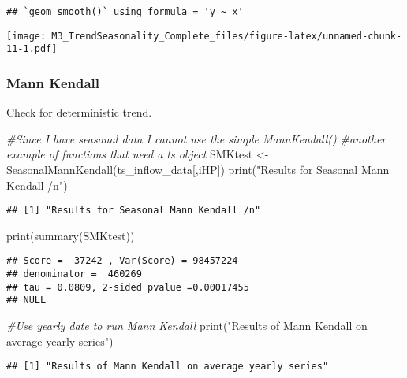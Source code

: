 \documentclass[
]{article}
\newenvironment{Shaded}{\begin{snugshade}}{\end{snugshade}}
\newcommand{\CommentTok}[1]{\textcolor[rgb]{0.56,0.35,0.01}{\textit{#1}}}
\newcommand{\FunctionTok}[1]{\textcolor[rgb]{0.00,0.00,0.00}{#1}}
\newcommand{\NormalTok}[1]{#1}
\newcommand{\OtherTok}[1]{\textcolor[rgb]{0.56,0.35,0.01}{#1}}
\newcommand{\StringTok}[1]{\textcolor[rgb]{0.31,0.60,0.02}{#1}}
\begin{document}
\begin{verbatim}
## `geom_smooth()` using formula = 'y ~ x'
\end{verbatim}

\texttt{[image: M3\_TrendSeasonality\_Complete\_files/figure-latex/unnamed-chunk-11-1.pdf]}

\hypertarget{mann-kendall}{%
\subsubsection{Mann Kendall}\label{mann-kendall}}

Check for deterministic trend.

\begin{Shaded}
\begin{Highlighting}[]
\CommentTok{\#Since I have seasonal data I cannot use the simple MannKendall()}
\CommentTok{\#another example of functions that need a ts object}
\NormalTok{SMKtest }\OtherTok{\textless{}{-}} \FunctionTok{SeasonalMannKendall}\NormalTok{(ts\_inflow\_data[,iHP])}
\FunctionTok{print}\NormalTok{(}\StringTok{"Results for Seasonal Mann Kendall /n"}\NormalTok{)}
\end{Highlighting}
\end{Shaded}

\begin{verbatim}
## [1] "Results for Seasonal Mann Kendall /n"
\end{verbatim}

\begin{Shaded}
\begin{Highlighting}[]
\FunctionTok{print}\NormalTok{(}\FunctionTok{summary}\NormalTok{(SMKtest))}
\end{Highlighting}
\end{Shaded}

\begin{verbatim}
## Score =  37242 , Var(Score) = 98457224
## denominator =  460269
## tau = 0.0809, 2-sided pvalue =0.00017455
## NULL
\end{verbatim}

\begin{Shaded}
\begin{Highlighting}[]
\CommentTok{\#Use yearly date to run Mann Kendall}
\FunctionTok{print}\NormalTok{(}\StringTok{"Results of Mann Kendall on average yearly series"}\NormalTok{)}
\end{Highlighting}
\end{Shaded}

\begin{verbatim}
## [1] "Results of Mann Kendall on average yearly series"
\end{verbatim}
\end{document}
